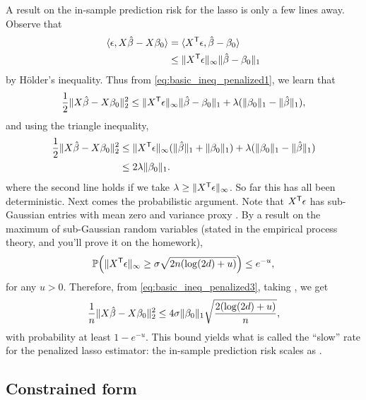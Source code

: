 \documentclass{article}
\begin{document}
A result on the in-sample prediction risk for the lasso is only a few lines
away. Observe that
\begin{align*}
\langle \epsilon, X\hat{\beta} - X\beta_0 \rangle 
&= \langle X^{\mathsf{T}} \epsilon, \hat{\beta} - \beta_0 \rangle \\
&\leq \|X^{\mathsf{T}} \epsilon\|_\infty \|\hat{\beta} - \beta_0\|_1 
\end{align*}
by H{\"o}lder's inequality. Thus from \eqref{eq:basic_ineq_penalized1}, we learn
that 
\begin{equation}
\label{eq:basic_ineq_penalized2}
\frac{1}{2} \|X\hat{\beta} - X\beta_0\|_2^2 \leq \|X^{\mathsf{T}} \epsilon\|_\infty \|\hat{\beta} -
\beta_0\|_1 + \lambda (\|\beta_0\|_1 - \|\hat{\beta}\|_1),  
\end{equation}
and using the triangle inequality, 
\begin{align}
\nonumber
\frac{1}{2} \|X\hat{\beta} - X\beta_0\|_2^2 
&\leq \|X^{\mathsf{T}} \epsilon\|_\infty (\|\hat{\beta}\|_1 + \|\beta_0\|_1) +
  \lambda (\|\beta_0\|_1 - \|\hat{\beta}\|_1) \\
\label{eq:basic_ineq_penalized3}
&\leq 2 \lambda \|\beta_0\|_1.
\end{align}
where the second line holds if we take $\lambda \geq \|X^{\mathsf{T}} \epsilon\|_\infty$.    
So far this has all been deterministic. Next comes the probabilistic 
argument. Note that $X^{\mathsf{T}} \epsilon$ has sub-Gaussian entries with mean zero and
variance proxy . By a result on the maximum of sub-Gaussian random variables
(stated in the empirical process theory, and you'll prove it on the homework), 
\[
\mathbb{P} \Big(\|X^{\mathsf{T}} \epsilon\|_\infty \geq \sigma \sqrt{2n (\log(2d) + u)} \Big) \leq 
e^{-u}, 
\]
for any $u>0$. Therefore, from \eqref{eq:basic_ineq_penalized3}, taking
, we get 
\begin{equation}
\label{eq:lasso_risk_penalized}
\frac{1}{n} \|X\hat{\beta} - X\beta_0\|_2^2 \leq 4 \sigma \|\beta_0\|_1 
  \sqrt{\frac{2 (\log(2d) + u)}{n}},
\end{equation}
with probability at least $1-e^{-u}$. This bound yields what is called the
``slow'' rate for the penalized lasso estimator: the in-sample prediction risk
scales as .

\subsection{Constrained form}
\end{document}
